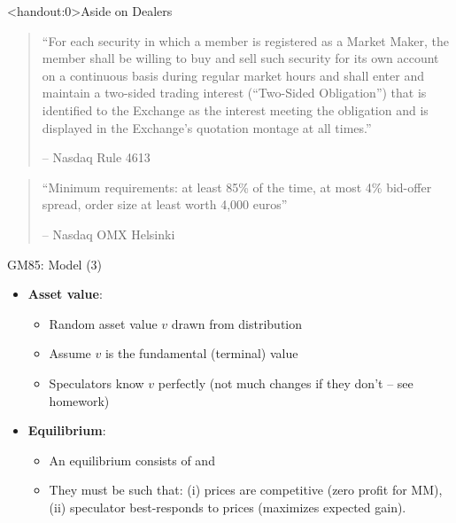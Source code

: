 \documentclass[english,10pt
,aspectratio=169
]{beamer}
\begin{document}
\begin{frame}<handout:0>{Aside on Dealers}
	\begin{quotation}
		\small ``For each security in which a member is registered as a Market Maker, the member shall be willing to buy and sell such security for its own account on a continuous basis during regular market hours and shall enter and maintain a two-sided trading interest (``Two-Sided Obligation'') that is identified to the Exchange as the interest meeting the obligation and is displayed in the Exchange's quotation montage at all times.''
		\begin{flushright}
			-- Nasdaq Rule 4613
		\end{flushright}
	\end{quotation}
	\vspace{3ex}
	\begin{quotation}
		\small ``Minimum requirements: at least 85\% of the time, at most 4\% bid-offer
		spread, order size at least worth 4,000 euros''
		\begin{flushright}
			-- Nasdaq OMX Helsinki
		\end{flushright}
	\end{quotation}
\end{frame}


\begin{frame}{GM85: Model (3)}
\begin{itemize}
	\item \textbf{Asset value}:
	\begin{itemize}
		\item Random asset value $v$ drawn from distribution
		\item Assume $v$ is the fundamental (terminal) value
		\item Speculators know $v$ perfectly (not much changes if they don't -- see homework)
	\end{itemize}
	\item \textbf{Equilibrium}:
	\begin{itemize}
		\item An equilibrium consists of  and 
		\item They must be such that: (i) prices are competitive (zero profit for MM), (ii) speculator best-responds to prices (maximizes expected gain).
	\end{itemize}
\end{itemize}
\end{frame}
\end{document}
